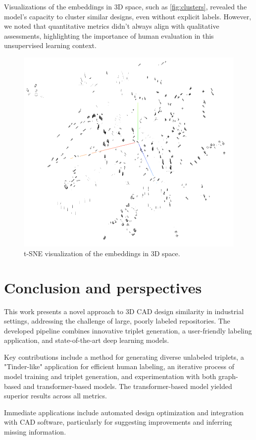 \documentclass{article}
\begin{document}
Visualizations of the embeddings in 3D space, such as \autoref{fig:clusters}, revealed the model's capacity to cluster similar designs, even without explicit labels. However, we noted that quantitative metrics didn't always align with qualitative assessments, highlighting the importance of human evaluation in this unsupervised learning context.

\begin{figure}[h]
    \centering
    \includegraphics[width=0.7\columnwidth]{assets/clusters_tsne.png}
    \caption{t-SNE visualization of the embeddings in 3D space.}
    \label{fig:clusters}
\end{figure}

\section{Conclusion and perspectives}

This work presents a novel approach to 3D CAD design similarity in industrial settings, addressing the challenge of large, poorly labeled repositories. The developed pipeline combines innovative triplet generation, a user-friendly labeling application, and state-of-the-art deep learning models. 

Key contributions include a method for generating diverse unlabeled triplets, a "Tinder-like" application for efficient human labeling, an iterative process of model training and triplet generation, and experimentation with both graph-based and transformer-based models. The transformer-based model yielded superior results across all metrics. 

Immediate applications include automated design optimization and integration with CAD software, particularly for suggesting improvements and inferring missing information.
\end{document}
